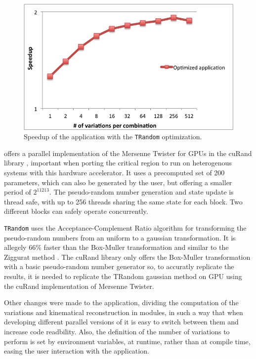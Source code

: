 \begin{figure}[!htp]
	\begin{center}
		\includegraphics[scale=0.7]{../../common/graphs/speedup_trandom_optim.png}  
		\caption{Speedup of the \tth application with the \texttt{TRandom} optimization.}
		\label{fig:TRandomOptim}
	\end{center}
\end{figure}

\nvidia offers a parallel implementation of the Mersenne Twister for GPUs \cite{NVIDIA:MersenneTwister} in the cuRand library \cite{NVIDIA:cuRand}, important when porting the critical region to run on heterogenous systems with this hardware accelerator. It uses a precomputed set of 200 parameters, which can also be generated by the user, but offering a smaller period of $2^{11213}$. The pseudo-random number generation and state update is thread safe, with up to 256 threads sharing the same state for each block. Two different blocks can safely operate concurrently.

\texttt{TRandom} uses the Acceptance-Complement Ratio algorithm \cite{AcceptanceRandom} for transforming the pseudo-random numbers from an uniform to a gaussian transformation. It is allegely 66\% faster than the Box-Muller transformation \cite{BoxMuller} and similar to the Ziggurat method \cite{Ziggurat}. The cuRand library only offers the Box-Muller transformation with a basic pseudo-random number generator so, to accuratly replicate the results, it is needed to replicate the TRandom gaussian method on GPU using the cuRand implementation of Mersenne Twister.

Other changes were made to the application, dividing the computation of the variations and kinematical reconstruction in modules, in such a way that when developing different parallel versions of \ttDilepKinFit it is easy to switch between them and increase code readbility. Also, the definition of the number of variations to perform is set by environment variables, at runtime, rather than at compile time, easing the user interaction with the application.
